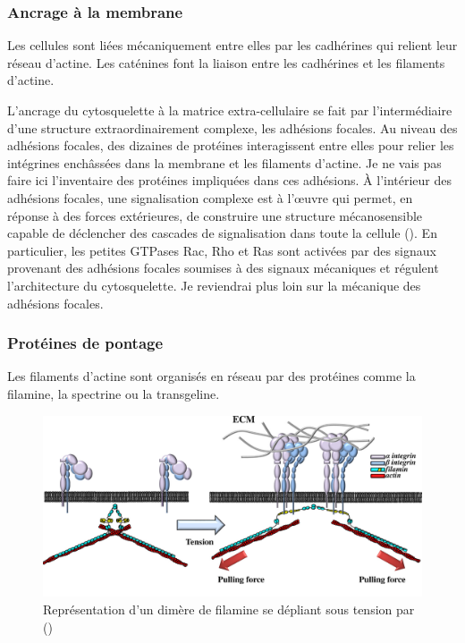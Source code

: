 \subsubsection{Ancrage à la membrane}

Les cellules sont liées mécaniquement entre elles par les cadhérines qui relient leur réseau d'actine. Les caténines font la liaison entre les cadhérines et les filaments d'actine. 

L'ancrage du cytosquelette à la matrice extra-cellulaire se fait par l'intermédiaire d'une structure extraordinairement complexe, les adhésions focales. 
Au niveau des adhésions focales, des dizaines de protéines interagissent entre elles pour relier les intégrines enchâssées dans la membrane et les filaments d'actine. 
Je ne vais pas faire ici l'inventaire des protéines impliquées dans ces adhésions. 
À l'intérieur des adhésions focales, une signalisation complexe est à l'\oe uvre qui permet, en réponse à des forces extérieures, de construire une structure mécanosensible capable de déclencher des cascades de signalisation dans toute la cellule (\cite{geiger_environmental_2009}). 
En particulier, les petites GTPases Rac, Rho et Ras sont activées par des signaux provenant des adhésions focales soumises à des signaux mécaniques et régulent l'architecture du cytosquelette.
Je reviendrai plus loin sur la mécanique des adhésions focales.  

\subsubsection{Protéines de pontage}

Les filaments d'actine sont organisés en réseau par des protéines comme la filamine, la spectrine ou la transgeline. 

\begin{figure}
\includegraphics[scale=0.25]{Figures/filamine.png} 
\caption{Représentation d'un dimère de filamine se dépliant sous tension par (\cite{janostiak_mechanosensors_2014}) \label{filamine}}
\end{figure}

